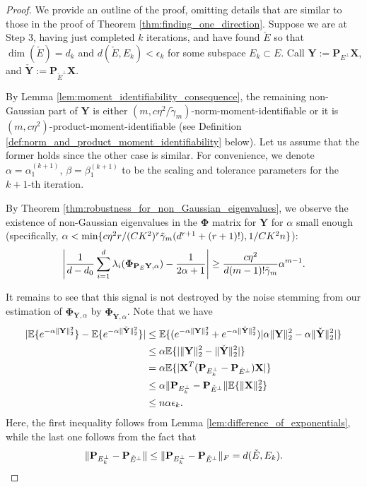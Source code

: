 \documentclass[final,12pt]{colt2018} %
\numberwithin{equation}{section}
\DeclarePairedDelimiter{\abs}{\lvert}{\rvert}
\DeclarePairedDelimiter{\norm}{\lVert}{\rVert}
\DeclarePairedDelimiter{\paren}{(}{)}
\DeclarePairedDelimiter{\braces}{\lbrace}{\rbrace}
\newcommand{\E}{\mathbb{E}}
\newcommand{\boldPhi}{\boldsymbol{\Phi}}
\newcommand{\boldP}{\textbf{P}}
\newcommand{\boldX}{\textbf{X}}
\newcommand{\boldY}{\textbf{Y}}
\begin{document}
\begin{proof}
	We provide an outline of the proof, omitting details that are similar to those in the proof of Theorem \ref{thm:finding_one_direction}. Suppose we are at Step 3, having just completed $k$ iterations, and have found $\check{E}$ so that $\dim(\check{E}) = d_k$ and $d(\check{E},E_k) < \epsilon_k$ for some subspace $E_k \subset E$. Call $\boldY := \boldP_{E^\perp}\boldX$, and $\check{\boldY} := \boldP_{\check{E}^\perp}\boldX$.
	
	By Lemma \ref{lem:moment_identifiability_consequence}, the remaining non-Gaussian part of $\boldY$ is either $(m,c\eta^2/\tilde{\gamma}_m)$-norm-moment-identifiable or it is $(m,c\eta^2)$-product-moment-identifiable (see Definition \ref{def:norm_and_product_moment_identifiability} below). Let us assume that the former holds since the other case is similar.  For convenience, we denote $\alpha = \alpha_1^{(k+1)}$, $\beta = \beta_1^{(k+1)}$ to be the scaling and tolerance parameters for the $k+1$-th iteration.
	
	By Theorem \ref{thm:robustness_for_non_Gaussian_eigenvalues}, we observe the existence of non-Gaussian eigenvalues in the $\boldPhi$ matrix for $\boldY$ for $\alpha$ small enough (specifically, $\alpha < \min\braces{c\eta^2 r/(CK^2)^r\tilde{\gamma}_m(d^{r+1}+(r+1)!),1/CK^2n}$):
	\begin{align}
	\abs*{\frac{1}{d-d_0}\sum_{i=1}^d\lambda_i(\boldPhi_{\boldP_E{\boldY},\alpha})-\frac{1}{2\alpha+1}} \geq \frac{c\eta^2}{d(m-1)!\tilde{\gamma}_m}\alpha^{m-1}.
	\end{align}
	
	It remains to see that this signal is not destroyed by the noise stemming from our estimation of $\boldPhi_{\boldY,\alpha}$ by $\hat{\boldPhi}_{\check{\boldY},\alpha}$.
	Note that we have
	\begin{align*}
	\abs{\E\braces{e^{-\alpha\norm{\boldY}_2^2}} - \E\braces{e^{-\alpha\norm{\check{\boldY}}_2^2}}} & \leq \E\braces{\paren{e^{-\alpha\norm{\boldY}_2^2}+ e^{-\alpha\norm{\check{\boldY}}_2^2}}\abs{\alpha\norm{\boldY}_2^2 - \alpha\norm{\check{\boldY}}_2^2}} \\
	& \leq \alpha \E\braces{\abs{\norm{\boldY}_2^2 - \norm{\check{\boldY}}_2^2}} \\
	& = \alpha \E\braces{\abs{\boldX^T\paren{\boldP_{E_k^\perp}-\boldP_{\check{E}^\perp}}\boldX}} \\
	& \leq \alpha \norm{\boldP_{E_k^\perp}-\boldP_{\check{E}^\perp}} \E\braces{\norm{\boldX}_2^2} \\
	& \leq n\alpha \epsilon_k.
	\end{align*}
	Here, the first inequality follows from Lemma \ref{lem:difference_of_exponentials}, while the last one follows from the fact that 
	\[
	\norm{\boldP_{E_k^\perp}-\boldP_{\check{E}^\perp}} \leq \norm{\boldP_{E_k^\perp}-\boldP_{\check{E}^\perp}}_F = d(\check{E},E_k).
	\]
	

\end{proof}
\end{document}
